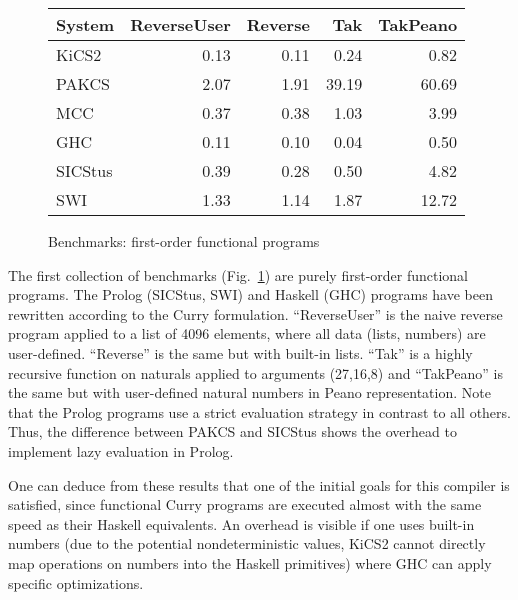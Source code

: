 \documentclass{llncs}
\begin{document}
\begin{figure}
\centering
\begin{tabular}{|@{~~}l@{~~}|*{4}{@{~~}r@{~~}|}}
\hline
System  & ReverseUser & Reverse &  Tak  & TakPeano \\\hline
KiCS2   &        0.13 &    0.11 &  0.24 &     0.82 \\
PAKCS   &        2.07 &    1.91 & 39.19 &    60.69 \\
MCC     &        0.37 &    0.38 &  1.03 &     3.99 \\
GHC     &        0.11 &    0.10 &  0.04 &     0.50 \\
SICStus &        0.39 &    0.28 &  0.50 &     4.82 \\
SWI     &        1.33 &    1.14 &  1.87 &    12.72 \\
\hline
\end{tabular}
\caption{Benchmarks: first-order functional programs}
 \label{fig:bench-first-order}
\end{figure}
%
The first collection of benchmarks (Fig.~\ref{fig:bench-first-order})
are purely first-order functional programs.
The Prolog (SICStus, SWI) and Haskell (GHC) programs have been rewritten
according to the Curry formulation.
``ReverseUser'' is the naive reverse program applied to a list of 4096 elements,
where all data (lists, numbers) are user-defined.
``Reverse'' is the same but with built-in lists.
``Tak'' is a highly recursive function on naturals applied
to arguments (27,16,8) and ``TakPeano'' is the same but with
user-defined natural numbers in Peano representation.
Note that the Prolog programs use a strict evaluation strategy
in contrast to all others. Thus, the difference between PAKCS and SICStus
shows the overhead to implement lazy evaluation in Prolog.

One can deduce from these results that one of the initial
goals for this compiler is satisfied, since functional Curry programs
are executed almost with the same speed as their Haskell equivalents.
An overhead is visible if one uses built-in numbers
(due to the potential nondeterministic values, KiCS2 cannot
directly map operations on numbers into the Haskell primitives)
where GHC can apply specific optimizations.
\end{document}
